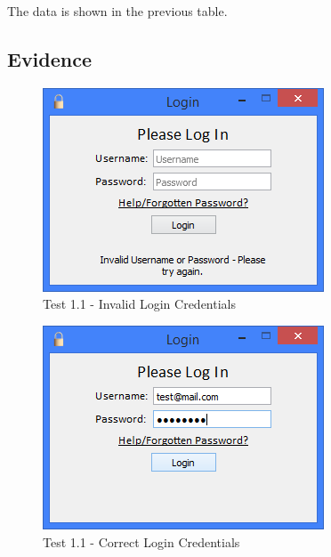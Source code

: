 \begin{landscape}
The data is shown in the previous table.

\subsection{Evidence}

\begin{figure}[H]
    \includegraphics[width=\textwidth]{./Testing/Evidence/LoginTestFail.png}
    \caption{Test 1.1 - Invalid Login Credentials}  \label{fig:LoginTestFail}
\end{figure}

\begin{figure}[H]
    \includegraphics[width=\textwidth]{./Testing/Evidence/LoginTestSucceed.png}
    \caption{Test 1.1 - Correct Login Credentials}  \label{fig:LoginTestSucceed}
\end{figure}


\end{landscape}
